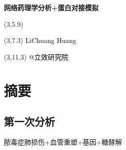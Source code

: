 \documentclass[
]{article}
\author{}
\date{\vspace{-2.5em}}
\begin{document}
\begin{titlepage} 
\begin{center} \textbf{\Huge
网络药理学分析+蛋白对接模拟} \vspace{4em}
\begin{textblock}{10}(3,5.9) \huge
\textbf{\textcolor{white}{2024-01-15}}
\end{textblock} \begin{textblock}{10}(3,7.3)
\Large \textcolor{black}{LiChuang Huang}
\end{textblock} \begin{textblock}{10}(3,11.3)
\Large \textcolor{black}{@立效研究院}
\end{textblock} \end{center} \end{titlepage}
\restoregeometry


\tableofcontents

\listoffigures

\listoftables

\newpage


\hypertarget{abstract}{%
\section{摘要}\label{abstract}}

\hypertarget{ux7b2cux4e00ux6b21ux5206ux6790}{%
\subsection{第一次分析}\label{ux7b2cux4e00ux6b21ux5206ux6790}}

脓毒症肺损伤+血管重塑+基因+糖酵解
\end{document}
